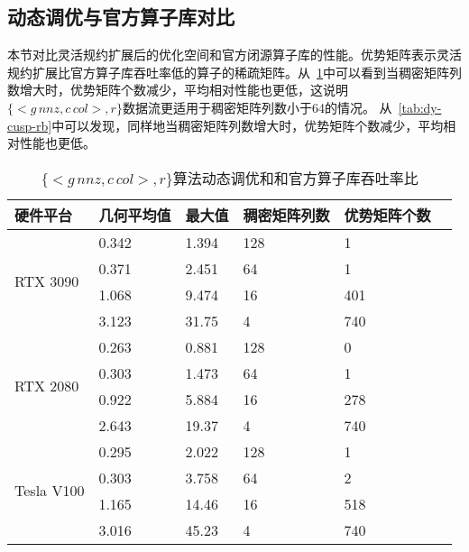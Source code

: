 \subsection{动态调优与官方算子库对比}\label{sec:overcu}
本节对比灵活规约扩展后的优化空间和官方闭源算子库的性能。优势矩阵表示灵活规约扩展比官方算子库吞吐率低的算子的稀疏矩阵。从~\ref{tab:dy-cusp-eb}中可以看到当稠密矩阵列数增大时，优势矩阵个数减少，平均相对性能也更低，这说明$\{<g\,nnz , c\,col>,r\}$数据流更适用于稠密矩阵列数小于64的情况。
从~\ref{tab:dy-cusp-rb}中可以发现，同样地当稠密矩阵列数增大时，优势矩阵个数减少，平均相对性能也更低。
\begin{table}
  \centering
  \caption{$\{<g\,nnz , c\,col>,r\}$算法动态调优和和官方算子库吞吐率比}
  \begin{tabular}{llllll}
  \toprule
  硬件平台 & 几何平均值 & 最大值  & 稠密矩阵列数 & 优势矩阵个数 \\
  \midrule
  \multirow{4}{*}{RTX 3090}& 0.342 & 1.394  & 128 & 1\\
                           & 0.371 & 2.451  & 64 & 1\\
                           & 1.068 & 9.474  & 16 & 401\\
                           & 3.123 & 31.75  & 4 & 740\\
  \hline
  \multirow{4}{*}{RTX 2080}& 0.263 & 0.881  & 128 & 0\\
                          & 0.303 & 1.473   & 64 & 1\\
                          & 0.922 & 5.884  & 16 & 278\\
                          & 2.643 & 19.37  & 4 & 740\\
  \hline
  \multirow{4}{*}{Tesla V100}& 0.295 & 2.022  & 128 & 1\\
                          & 0.303 & 3.758  & 64 & 2\\
                          & 1.165 & 14.46  & 16 & 518\\
                          & 3.016 & 45.23  & 4 & 740\\
  \bottomrule
  \end{tabular}
  \label{tab:dy-cusp-eb}
\end{table}
